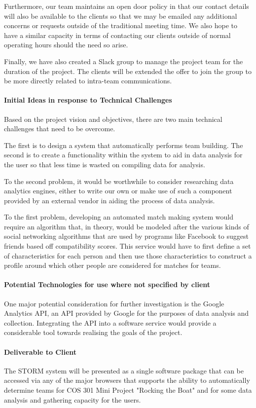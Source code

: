 \documentclass[12pt]{article}
\begin{document}
Furthermore, our team maintains an open door policy in that our contact details will also be available to the clients so that we may be emailed any additional concerns or requests outside of the traditional meeting time. We also hope to have a similar capacity in terms of contacting our clients outside of normal operating hours should the need so arise.

Finally, we have also created a Slack group to manage the project team for the duration of the project. The clients will be extended the offer to join the group to be more directly related to intra-team communications.
\paragraph{Initial Ideas in response to Technical Challenges}
Based on the project vision and objectives, there are two main technical challenges that need to be overcome.

The first is to design a system that automatically performs team building. The second is to create a functionality within the system to aid in data analysis for the user so that less time is wasted on compiling data for analysis.

To the second problem, it would be worthwhile to consider researching data analytics engines, either to write our own or make use of such a component provided by an external vendor in aiding the process of data analysis.

To the first problem, developing an automated match making system would require an algorithm that, in theory, would be modeled after the various kinds of social networking algorithms that are used by programs like Facebook to suggest friends based off compatibility scores. This service would have to first define a set of characteristics for each person and then use those characteristics to construct a profile around which other people are considered for matches for teams.
\paragraph{Potential Technologies for use where not specified by client}
One major potential consideration for further investigation is the Google Analytics API, an API provided by Google for the purposes of data analysis and collection. Integrating the API into a software service would provide a considerable tool towards realising the goals of the project.
\paragraph{Deliverable to Client}
The STORM system will be presented as a single software package that can be accessed via any of the major browsers that supports the ability to automatically determine teams for COS 301 Mini Project "Rocking the Boat" and for some data analysis and gathering capacity for the users.
\end{document}
